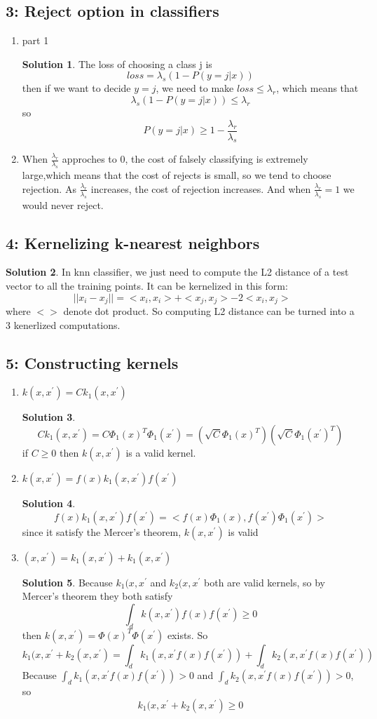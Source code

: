 \documentclass[]{book}
\theoremstyle{definition}
\newtheorem*{soln}{Solution}
\begin{document}
\subsection*{3: Reject option in classifiers  }
\begin{enumerate}
	\item part 1
	\begin{soln}
		The loss of choosing a class j is 
		$$loss = \lambda_s (1 - P(y = j | x))$$
		then if we want to decide $y=j$, we need to make $loss \leq \lambda_r$, which means that
		$$\lambda_s(1 - P(y = j | x))\leq \lambda_r$$
		so
		$$ P(y = j | x)\geq 1- \frac{\lambda_r}{\lambda_s}$$
	\end{soln}
	\item When $\frac{\lambda_r}{\lambda_s}$ approches to 0, the cost of falsely classifying is extremely large,which means that the cost of rejects is small, so we tend to choose rejection.
	As  $\frac{\lambda_r}{\lambda_s}$ increases, the cost of rejection increases. And when $\frac{\lambda_r}{\lambda_s} = 1$ we would never reject.
\end{enumerate}
\subsection*{4: Kernelizing k-nearest neighbors  }
\begin{soln}
	In knn classifier, we just need to compute the L2 distance of a test vector to all the training points. It can be kernelized in this form:
	$$||x_i - x_j|| = <x_i,x_i> + <x_j,x_j> - 2<x_i,x_j>$$
	where $<>$ denote dot product. So computing L2 distance can be turned into a 3 kenerlized computations.
\end{soln}
\subsection*{5: Constructing kernels  }
\begin{enumerate}
	\item $k(x,x^{'}) = C k_1(x,x^{'})$
	\begin{soln}
		$$C k_1(x,x^{'}) = C \Phi_1(x)^T \Phi_1(x^{'}) = (\sqrt{C}\Phi_1(x)^T)(\sqrt{C}\Phi_1(x^{'})^T)$$
		if $C\geq0$ then $k(x,x^{'})$ is a valid kernel.
	\end{soln}
	\item $k(x,x^{'}) = f(x) k_1(x,x^{'}) f(x^{'})$
	\begin{soln}
		$$f(x) k_1(x,x^{'})f(x^{'}) = <f(x)\Phi_1(x),  f(x^{'})\Phi_1(x^{'})>$$
		since it satisfy the Mercer's theorem, $k(x,x^{'})$ is valid
	\end{soln} 
	\item $(x,x^{'}) = k_1(x,x^{'}) + k_1(x,x^{'})$
	\begin{soln}
		Because $k_1(x,x^{'}$ and $k_2(x,x^{'}$ both are valid kernels, so by Mercer's theorem they both satisfy
		$$\int_d k(x,x^{'})f(x)f(x^{'})\geq0$$
		then $k(x,x^{'}) = \Phi(x)^T \Phi(x^{'})$ exists.
		So 
		$$k_1(x,x^{'} + k_2(x,x^{'}) = \int_d k_1(x,x^{'}f(x)f(x^{'})) + \int_d k_2(x,x^{'}f(x)f(x^{'}))$$
		Because $\int_d k_1(x,x^{'}f(x)f(x^{'})) > 0 $ and $\int_d k_2(x,x^{'}f(x)f(x^{'})) > 0 $, so
		$$k_1(x,x^{'} + k_2(x,x^{'}) \ge 0$$
	\end{soln}
\end{enumerate}
\end{document}

